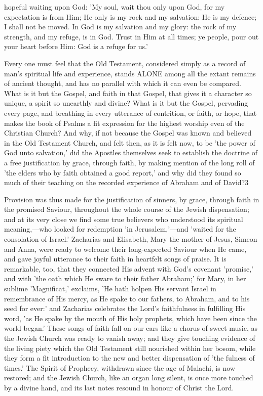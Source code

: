 \documentclass[
]{book}
\begin{document}
hopeful waiting upon God: 'My soul, wait thou only upon God, for my expectation is from Him; He only is my rock and my salvation: He is my defence; I shall not be moved. In God is my salvation and my glory: the rock of my strength, and my refuge, is in God. Trust in Him at all times; ye people, pour out your heart before Him: God is a refuge for us.'

Every one must feel that the Old Testament, considered simply as a record of man's spiritual life and experience, stands ALONE among all the extant remains of ancient thought, and has no parallel with which it can even be compared. What is it but the Gospel, and faith in that Gospel, that gives it a character so unique, a spirit so unearthly and divine? What is it but the Gospel, pervading every page, and breathing in every utterance of contrition, or faith, or hope, that makes the book of Psalms a fit expression for the highest worship even of the Christian Church? And why, if not because the Gospel was known and believed in the Old Testament Church, and felt then, as it is felt now, to be 'the power of God unto salvation,' did the Apostles themselves seek to establish the doctrine of a free justification by grace, through faith, by making mention of the long roll of 'the elders who by faith obtained a good report,' and why did they found so much of their teaching on the recorded experience of Abraham and of David?3

Provision was thus made for the justification of sinners, by grace, through faith in the promised Saviour, throughout the whole course of the Jewish dispensation; and at its very close we find some true believers who understood its spiritual meaning,---who looked for redemption 'in Jerusalem,'---and 'waited for the consolation of Israel.' Zacharias and Elisabeth, Mary the mother of Jesus, Simeon and Anna, were ready to welcome their long-expected Saviour when He came, and gave joyful utterance to their faith in heartfelt songs of praise. It is remarkable, too, that they connected His advent with God's covenant 'promise,' and with 'the oath which He sware to their father Abraham;' for Mary, in her sublime 'Magnificat,' exclaims, 'He hath holpen His servant Israel in remembrance of His mercy, as He spake to our fathers, to Abraham, and to his seed for ever:' and Zacharias celebrates the Lord's faithfulness in fulfilling His word, 'as He spake by the mouth of His holy prophets, which have been since the world began.' These songs of faith fall on our ears like a chorus of sweet music, as the Jewish Church was ready to vanish away; and they give touching evidence of the living piety which the Old Testament still nourished within her bosom, while they form a fit introduction to the new and better dispensation of 'the fulness of times.' The Spirit of Prophecy, withdrawn since the age of Malachi, is now restored; and the Jewish Church, like an organ long silent, is once more touched by a divine hand, and its last notes resound in honour of Christ the Lord.
\end{document}
